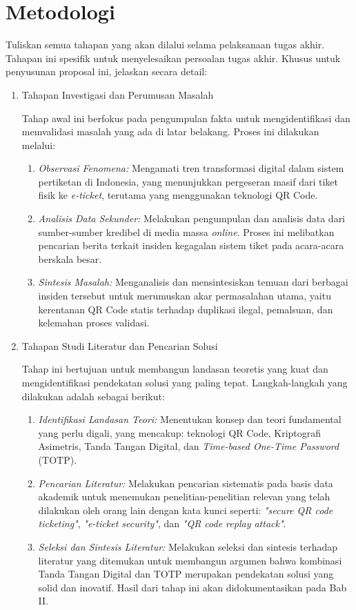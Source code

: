 \section{Metodologi}
Tuliskan semua tahapan yang akan dilalui selama pelaksanaan tugas akhir. Tahapan ini spesifik untuk menyelesaikan persoalan tugas akhir. Khusus untuk penyusunan proposal ini, jelaskan secara detail:
\begin{enumerate}
\item Tahapan Investigasi dan Perumusan Masalah
    
Tahap awal ini berfokus pada pengumpulan fakta untuk mengidentifikasi dan memvalidasi masalah yang ada di latar belakang. Proses ini dilakukan melalui:
\begin{enumerate}
\item \textit{Observasi Fenomena:} Mengamati tren transformasi digital dalam sistem pertiketan di Indonesia, yang menunjukkan pergeseran masif dari tiket fisik ke \textit{e-ticket}, terutama yang menggunakan teknologi QR Code.
\item \textit{Analisis Data Sekunder:} Melakukan pengumpulan dan analisis data dari sumber-sumber kredibel di media massa \textit{online}. Proses ini melibatkan pencarian berita terkait insiden kegagalan sistem tiket pada acara-acara berskala besar.
\item \textit{Sintesis Masalah:} Menganalisis dan mensintesiskan temuan dari berbagai insiden tersebut untuk merumuskan akar permasalahan utama, yaitu kerentanan QR Code statis terhadap duplikasi ilegal, pemalsuan, dan kelemahan proses validasi.

\end{enumerate}


\item Tahapan Studi Literatur dan Pencarian Solusi    

Tahap ini bertujuan untuk membangun landasan teoretis yang kuat dan mengidentifikasi pendekatan solusi yang paling tepat. Langkah-langkah yang dilakukan adalah sebagai berikut:
\begin{enumerate}
\item \textit{Identifikasi Landasan Teori:} Menentukan konsep dan teori fundamental yang perlu digali, yang mencakup: teknologi QR Code, Kriptografi Asimetris, Tanda Tangan Digital, dan \textit{Time-based One-Time Password} (TOTP).
\item \textit{Pencarian Literatur:} Melakukan pencarian sistematis pada basis data akademik untuk menemukan penelitian-penelitian relevan yang telah dilakukan oleh orang lain dengan kata kunci seperti: \textit{"secure QR code ticketing"}, \textit{"e-ticket security"}, dan \textit{"QR code replay attack"}.
\item \textit{Seleksi dan Sintesis Literatur:} Melakukan seleksi dan sintesis terhadap literatur yang ditemukan untuk membangun argumen bahwa kombinasi Tanda Tangan Digital dan TOTP merupakan pendekatan solusi yang solid dan inovatif. Hasil dari tahap ini akan didokumentasikan pada Bab II.
\end{enumerate}



\end{enumerate}
